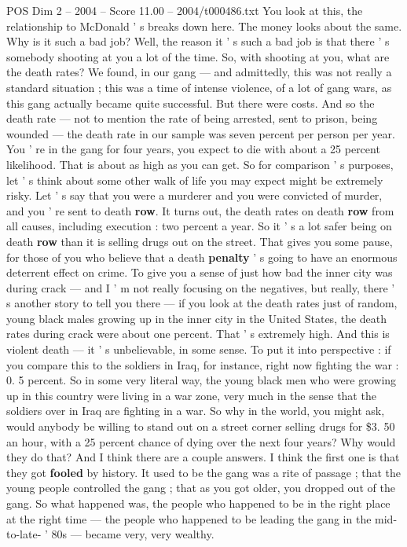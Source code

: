 \begin{textsample}{POS Dim 2 – 2004 – Score 11.00 – 2004/t000486.txt}
You look at this, the relationship to McDonald ' s breaks down here.
The money looks about the same.
Why is it such a bad job?
Well, the reason it ' s such a bad job is that there ' s somebody shooting at you a lot of the time.
So, with shooting at you, what are the death rates?
We found, in our gang — and admittedly, this was not really a standard situation ; this was a time of intense violence, of a lot of gang wars, as this gang actually became quite successful.
But there were costs.
And so the death rate — not to mention the rate of being arrested, sent to prison, being wounded — the death rate in our sample was seven percent per person per year.
You ' re in the gang for four years, you expect to die with about a 25 percent likelihood.
That is about as high as you can get.
So for comparison ' s purposes, let ' s think about some other walk of life you may expect might be extremely risky.
Let ' s say that you were a murderer and you were convicted of murder, and you ' re sent to death \textbf{row}.
It turns out, the death rates on death \textbf{row} from all causes, including execution : two percent a year.
So it ' s a lot safer being on death \textbf{row} than it is selling drugs out on the street.
That gives you some pause, for those of you who believe that a death \textbf{penalty} ' s going to have an enormous deterrent effect on crime.
To give you a sense of just how bad the inner city was during crack — and I ' m not really focusing on the negatives, but really, there ' s another story to tell you there — if you look at the death rates just of random, young black males growing up in the inner city in the United States, the death rates during crack were about one percent.
That ' s extremely high.
And this is violent death — it ' s unbelievable, in some sense.
To put it into perspective : if you compare this to the soldiers in Iraq, for instance, right now fighting the war : 0. 5 percent.
So in some very literal way, the young black men who were growing up in this country were living in a war zone, very much in the sense that the soldiers over in Iraq are fighting in a war.
So why in the world, you might ask, would anybody be willing to stand out on a street corner selling drugs for \$3. 50 an hour, with a 25 percent chance of dying over the next four years?
Why would they do that?
And I think there are a couple answers.
I think the first one is that they got \textbf{fooled} by history.
It used to be the gang was a rite of passage ; that the young people controlled the gang ; that as you got older, you dropped out of the gang.
So what happened was, the people who happened to be in the right place at the right time — the people who happened to be leading the gang in the mid-to-late- ' 80s — became very, very wealthy.

\end{textsample}
